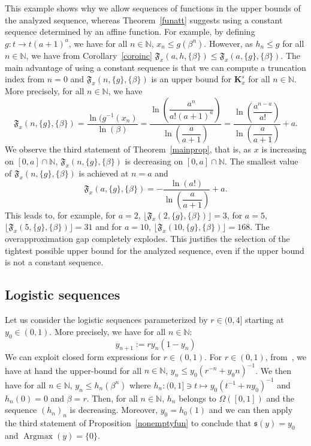 \documentclass{article}
\def\valu#1{\mathfrak{s}(#1)}
\def\fset{\Omega([0,1])}
\def\nn{\mathbb N}
\def\agmx{\operatorname{Argmax}}
\def\bigks{\mathbf{K}^s}
\def\red#1{#1}
\def\blue#1{#1}
\begin{document}
		This example shows why we allow sequences of functions in \red{the} upper bounds of the analyzed sequence, whereas Theorem~\ref{funatt} suggests \red{using} a constant sequence determined by an affine function. For example, \blue{by} defining $g:t\to t(a+1)^a$, we have for all $n\in\nn$, $x_n\leq g(\beta^n)$. However, as $h_n\leq g$ for all $n\in\nn$, we have from Corollary~\ref{coroinc} $\blue{\mathfrak{F}_x}(a,h,\{\beta\})\leq \blue{\mathfrak{F}_x}(a,\{g\},\{\beta\})$. The main advantage of using a constant sequence is that we can compute a truncation index from $n=0$ and $\blue{\mathfrak{F}_x}(n,\{g\},\{\beta\})$ is an upper bound for $\bigks_x$ for all $n\in\nn$. More precisely, for all $n\in\nn$, \red{we have}
		\[
		\mathfrak{F}_x(n,\{g\},\{\beta\})=\dfrac{\ln(g^{-1}(x_n)}{\ln(\beta)}=\dfrac{\ln\left(\dfrac{a^n}{a!(a+1)^a}\right)}{\ln\left(\dfrac{a}{a+1}\right)}=
		\dfrac{\ln\left(\dfrac{a^{n-a}}{a!}\right)}{\ln\left(\dfrac{a}{a+1}\right)}+a.
		\] 
		We \blue{observe} the third statement of Theorem~\ref{mainprop}, that is, as $x$ is increasing on $[0,a]\cap \nn$, $\mathfrak{F}_x(n,\{g\},\{\beta\})$ is decreasing on $[0,a]\cap \nn$. The smallest value of $\mathfrak{F}_x(n,\{g\},\{\beta\})$ is achieved at $n=a$ and
		\[
		\mathfrak{F}_x(a,\{g\},\{\beta\})=
		-\dfrac{\ln(a!)}{\ln\left(\dfrac{a}{a+1}\right)}+a.
		\]
		This leads to, for example, \blue{for $a=2$,} $\lfloor\mathfrak{F}_x(2,\{g\},\{\beta\})\rfloor=3$, \blue{for $a=5$,}  $\lfloor\mathfrak{F}_x(5,\{g\},\{\beta\})\rfloor=31$ and \blue{for $a=10$,} $\lfloor\mathfrak{F}_x(10,\{g\},\{\beta\})\rfloor=168$. The overapproximation gap completely explodes. This justifies \red{the selection of} the tightest possible upper bound \blue{for} the analyzed sequence, even if the upper bound is not a constant sequence.
		
		\subsection{Logistic \red{sequences}}
		Let \red{us} consider \red{the} logistic sequences parameterized by $r\in (0,4]$ starting at $y_0\in (0,1)$. More precisely, we have for all $n\in\nn$:
		\[
		y_{n+1}:=ry_n(1-y_n)
		\]
		We can exploit closed form \blue{expressions} for $r\in (0,1)$. For $r\in (0,1)$, from~\cite[Lemma A.6]{campbell2019automated}, we have at hand the upper-bound for all $n\in\nn$, $y_n\leq y_0(r^{-n}+y_0 n)^{-1}$. We then have for all $n\in\nn$, $y_n\leq h_n(\beta^n)$ where $h_n:(0,1]\ni t\mapsto y_0(t^{-1}+n y_0)^{-1}$ and $h_n(0)=0$ and $\beta=r$. Then, for all $n\in\nn$, $h_n$ belongs to $\fset$ and the sequence $(h_n)_n$ is decreasing. Moreover, $y_0=h_0(1)$ and we can then apply the third statement of Proposition~\ref{nonemptyfun} to conclude that $\valu{y}=y_0$ and $\agmx(y)=\{0\}$. 
		
\end{document}
